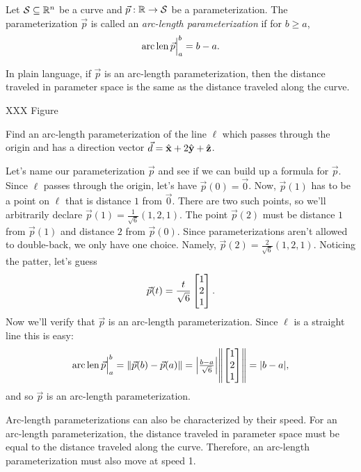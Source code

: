 \begin{definition}
	Let $\mathcal S\subseteq\mathbb{R}^n$ be a curve and $\vec p:\mathbb{R}\to\mathcal S$ be a parameterization.
	The parameterization $\vec p$ is called an \emph{arc-length parameterization} if for $b\geq a$,
	\[
		\operatorname{arc\,len} \vec p \Big|_{a}^{b}=b-a.
	\]
\end{definition}

In plain language, if $\vec p$ is an arc-length parameterization, then the distance traveled in parameter
space is the same as the distance traveled along the curve.

XXX Figure

\begin{example}
	Find an arc-length parameterization of the line $\ell$ which passes through
	the origin and has a direction vector $\vec d={\hat {\mathbf x}}+2{\hat {\mathbf y}}+{\hat {\mathbf z}}$.

	Let's name our parameterization $\vec p$ and see if we can build up
	a formula for $\vec p$.
	Since $\ell$ passes through the origin, let's have $\vec p(0)=\vec 0$.
	Now, $\vec p(1)$ has to be a point on $\ell$ that is distance $1$ from $\vec 0$.
	There are two such points, so we'll arbitrarily declare
	$
		\vec p(1) = \frac{1}{\sqrt{6}}(1,2,1).
	$
	The point $\vec p(2)$ must be distance $1$ from $\vec p(1)$ and distance $2$ from $\vec p(0)$.
	Since parameterizations aren't allowed to double-back, we only have one choice.  Namely,
	$
		\vec p(2) = \frac{2}{\sqrt{6}}(1,2,1).
	$
	Noticing the patter, let's guess
	\[
		\vec p(t) = \frac{t}{\sqrt{6}}\mat{1\\2\\1}.
	\]
	Now we'll verify that $\vec p$ is an arc-length parameterization.  Since $\ell$ is
	a straight line this is easy:
	\[
		\Arclenfrom{\vec p}{a}{b}=\norm{\vec p(b)-\vec p(a)} = \abs*{\tfrac{b-a}{\sqrt{6}}}\norm*{\mat{1\\2\\1}}
		=\abs{b-a},
	\]
	and so $\vec p$ is an arc-length parameterization.
\end{example}

Arc-length parameterizations can also be characterized by their speed.  For an arc-length
parameterization, the distance traveled in parameter space must be equal to the distance
traveled along the curve.  Therefore, an arc-length parameterization must also move at
speed 1.

